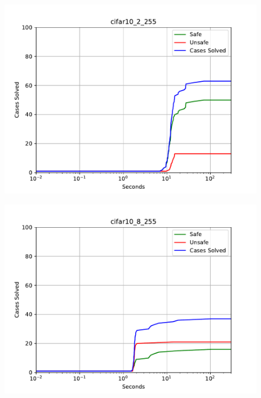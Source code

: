 \begin{figure}[!ht]
\center
\includegraphics[scale=0.8]{figures/cifar10_2_255.pdf}
\end{figure}

\begin{figure}[!ht]
\center
\includegraphics[scale=0.8]{figures/cifar10_8_255.pdf}
\end{figure}

